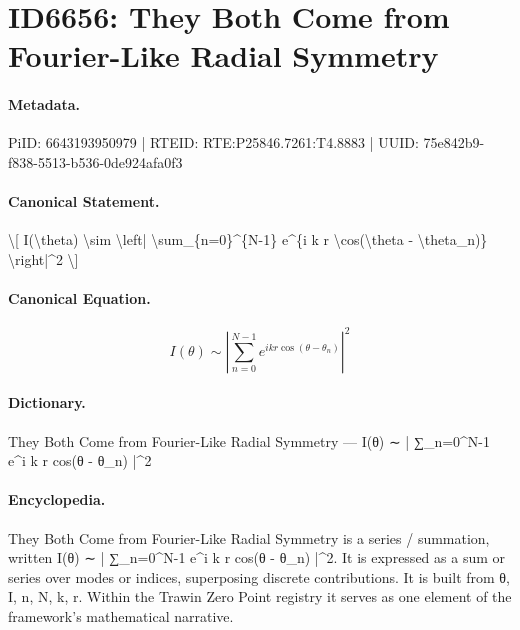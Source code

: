 \section*{ID6656: They Both Come from Fourier-Like Radial Symmetry}
\paragraph{Metadata.}
PiID: 6643193950979 | RTEID: RTE:P25846.7261:T4.8883 | UUID: 75e842b9-f838-5513-b536-0de924afa0f3

\paragraph{Canonical Statement.}
\textbackslash{}[ I(\textbackslash{}theta) \textbackslash{}sim \textbackslash{}left| \textbackslash{}sum\_\{n=0\}\textasciicircum{}\{N-1\} e\textasciicircum{}\{i k r \textbackslash{}cos(\textbackslash{}theta - \textbackslash{}theta\_n)\} \textbackslash{}right|\textasciicircum{}2 \textbackslash{}]

\paragraph{Canonical Equation.}
\[
I(\theta) \sim \left| \sum_{n=0}^{N-1} e^{i k r \cos(\theta - \theta_n)} \right|^2
\]

\paragraph{Dictionary.}
They Both Come from Fourier-Like Radial Symmetry — I(θ) ∼ | ∑\_n=0\textasciicircum{}N-1 e\textasciicircum{}i k r cos(θ - θ\_n) |\textasciicircum{}2

\paragraph{Encyclopedia.}
They Both Come from Fourier-Like Radial Symmetry is a series / summation, written I(θ) ∼ | ∑\_n=0\textasciicircum{}N-1 e\textasciicircum{}i k r cos(θ - θ\_n) |\textasciicircum{}2. It is expressed as a sum or series over modes or indices, superposing discrete contributions. It is built from θ, I, n, N, k, r. Within the Trawin Zero Point registry it serves as one element of the framework's mathematical narrative.
